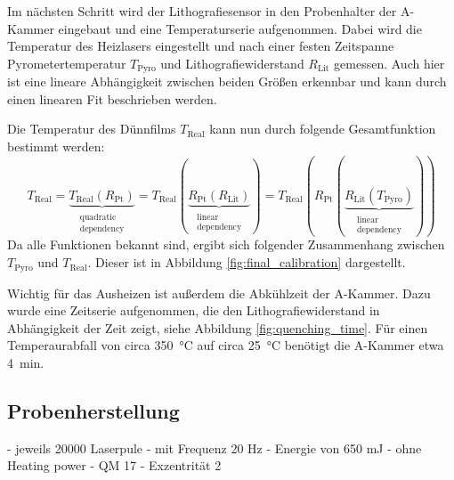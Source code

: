 Im nächsten Schritt wird der Lithografiesensor in den Probenhalter der A-Kammer eingebaut und eine Temperaturserie
aufgenommen.
Dabei wird die Temperatur des Heizlasers eingestellt und nach einer festen Zeitspanne Pyrometertemperatur
$T_\mathrm{Pyro}$ und Lithografiewiderstand $R_\mathrm{Lit}$ gemessen.
Auch hier ist eine lineare Abhängigkeit zwischen beiden Größen erkennbar und kann durch einen linearen Fit
beschrieben werden.

Die Temperatur des Dünnfilms $T_\mathrm{Real}$ kann nun durch folgende Gesamtfunktion bestimmt werden:
\begin{equation}
    T_{\mathrm{Real}}=\underbrace{ T_{\mathrm{Real}}(R_{\mathrm{Pt}}) }_{ \substack{\text{quadratic} \\ \text{dependency}} }
    =T_{\mathrm{Real}}(\underbrace{ R_{\mathrm{Pt}}(R_{\mathrm{Lit}}) }_{  \substack{\text{linear} \\ \text{dependency}}  })
    =T_{\mathrm{Real}}(R_{\mathrm{Pt}}(\underbrace{ R_{\mathrm{Lit}}(T_{\mathrm{Pyro}}) }_{    \substack{\text{linear} \\
    \text{dependency}}  }))
    \label{eq:temperature_calibration}
\end{equation}
Da alle Funktionen bekannt sind, ergibt sich folgender Zusammenhang zwischen $T_{\mathrm{Pyro}}$ und $T_{\mathrm{Real}}$.
Dieser ist in Abbildung \ref{fig:final_calibration} dargestellt.

Wichtig für das Ausheizen ist außerdem die Abkühlzeit der A-Kammer.
Dazu wurde eine Zeitserie aufgenommen, die den Lithografiewiderstand in Abhängigkeit der Zeit zeigt, siehe
Abbildung \ref{fig:quenching_time}.
Für einen Temperaurabfall von circa \qty{350}{\degreeCelsius} auf circa \qty{25}{\degreeCelsius}
benötigt die A-Kammer etwa \qty{4}{\minute}.

\subsection{Probenherstellung}\label{subsec:probenherstellung}
- jeweils 20000 Laserpule
- mit Frequenz 20 Hz
- Energie von 650 mJ
- ohne Heating power
- QM 17
- Exzentrität 2

